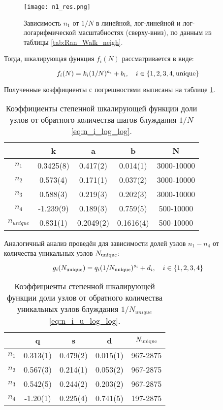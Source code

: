 \begin{figure}
\centering
\texttt{[image: n1\_res.png]}
\caption{Зависимость $n_1$ от $1/N$  в линейной, лог-линейной и лог-логарифмической масштабностях (сверху-вниз), по данным из таблицы \ref{tab:Ran_Walk_neigh}.} 
\label{fig:n1_scale}
\end{figure}

Тогда, шкалирующая функция $f_i(N)$ рассматривается в виде:

\begin{equation}
f_i(N) = k_i (1/N)^{a_i} + b_i,\ \ \ i \in \{1,2,3,4, \textup{unique}\}
\label{eq:n_i_log_log}
\end{equation}

Полученные коэффициенты с погрешностями выписаны на таблице \ref{tab:n_i_log_log}.

\begin{table}[h]
\centering
\begin{tabular}{|c|c|c|c|c|}
\hline
 & k & a & b & N \\ \hline
$n_1$ & 0.3425(8) & 0.417(2) & 0.014(1) & 3000-10000 \\ \hline
$n_2$ & 0.573(4) & 0.171(1) & 0.037(2) & 3000-10000 \\ \hline
$n_3$ & 0.588(3) & 0.219(3) & 0.202(3) & 3000-10000 \\ \hline
$n_4$ & -1.239(9) & 0.189(3) & 0.759(5) & 500-10000 \\ \hline
$n_{unique}$ & 0.831(1) & 0.2049(2) & 0.1616(4) & 500-10000 \\ \hline
\end{tabular}
\caption{Коэффициенты степенной шкалирующей функции доли узлов от обратного количества шагов блуждания $1/N$ \eqref{eq:n_i_log_log}.}
\label{tab:n_i_log_log}
\end{table}
Аналогичный анализ проведён для зависимости долей узлов $n_1 - n_4$ от количества уникальных узлов $N_{\textup{unique}}$:

\begin{equation}
g_i (\Nun) = q_i  (1/\Nun)^{s_i} + d_i,\ \ \ i \in \{1,2,3,4\}
\label{eq:n_i_u_log_log}
\end{equation}

\begin{table}[h]
\centering
\begin{tabular}{|c|c|c|c|c|}
\hline
 & q & s & d & $N_{\textup{unique}}$ \\ \hline
$n_1$ & 0.313(1) & 0.479(2) & 0.015(1) & 967-2875 \\ \hline
$n_2$ & 0.567(3) & 0.214(1) & 0.053(2) & 967-2875 \\ \hline
$n_3$  & 0.542(5) & 0.244(2) & 0.203(2) & 967-2875 \\ \hline
$n_4$ & -1.20(1) & 0.225(4) & 0.741(5) & 197-2875 \\ \hline
\end{tabular} 
\caption{Коэффициенты степенной шкалирующей функции доли узлов от обратного количества уникальных узлов блуждания $1/N_{unique}$ \eqref{eq:n_i_u_log_log}.}
\label{tab:n_i_u_log_log}
\end{table}

\newpage 